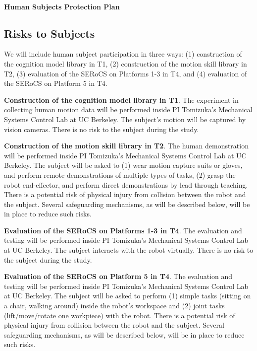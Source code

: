 \setcounter{page}{1}
\renewcommand{\thepage}{\arabic{page}}

~
\vspace{-15pt}
\begin{center}
\Large{\textbf{Human Subjects Protection Plan}}
\end{center}
\subsection{Risks to Subjects}

We will include human subject participation in three ways: (1) construction of the cognition model library in T1, (2) construction of the motion skill library in T2, (3) evaluation of the SERoCS on Platforms 1-3 in T4, and (4) evaluation of the SERoCS on Platform 5 in T4.

\textbf{Construction of the cognition model library in T1}. The experiment in collecting human motion data will be performed inside PI Tomizuka's Mechanical Systems Control Lab at UC Berkeley. The subject's motion will be captured by vision cameras. There is no risk to the subject during the study.

\textbf{Construction of the motion skill library in T2}. The human demonstration will be performed inside PI Tomizuka's Mechanical Systems Control Lab at UC Berkeley. The subject will be asked to (1) wear motion capture suits or gloves, and perform remote demonstrations of multiple types of tasks, (2) grasp the robot end-effector, and perform direct demonstrations by lead through teaching. There is a potential risk of physical injury from collision between the robot and the subject. Several safeguarding mechanisms, as will be described below, will be in place to reduce such risks.

\textbf{Evaluation of the SERoCS on Platforms 1-3 in T4}. The evaluation and testing will be performed inside PI Tomizuka's Mechanical Systems Control Lab at UC Berkeley. The subject interacts with the robot virtually. There is no risk to the subject during the study.

\textbf{Evaluation of the SERoCS on Platform 5 in T4}. The evaluation and testing will be performed inside PI Tomizuka's Mechanical Systems Control Lab at UC Berkeley. The subject will be asked to perform (1) simple tasks (sitting on a chair, walking around) inside the robot's workspace and (2) joint tasks (lift/move/rotate one workpiece) with the robot. There is a potential risk of physical injury from collision between the robot and the subject. Several safeguarding mechanisms, as will be described below, will be in place to reduce such risks.

